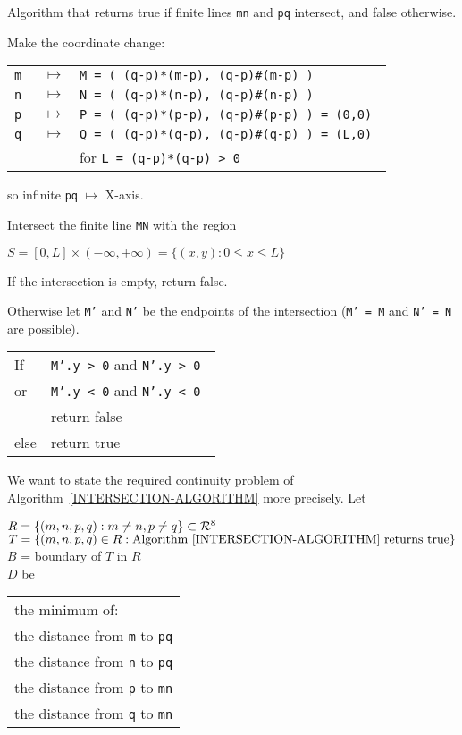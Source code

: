 \documentclass[12pt]{article}
\begin{document}
\begin{algorithm}\label{INTERSECTION-ALGORITHM}
Algorithm that returns true if finite lines {\tt mn} and {\tt pq}
intersect, and false otherwise.

Make the coordinate change:
\begin{center}
\begin{tabular}{rcl}
\tt m & $\longmapsto$ & \tt M = ( (q-p)*(m-p), (q-p)\#(m-p) ) \\
\tt n & $\longmapsto$ & \tt N = ( (q-p)*(n-p), (q-p)\#(n-p) ) \\
\tt p & $\longmapsto$ & \tt P = ( (q-p)*(p-p), (q-p)\#(p-p) ) = (0,0) \\
\tt q & $\longmapsto$ & \tt Q = ( (q-p)*(q-p), (q-p)\#(q-p) ) = (L,0) \\
      &               & for {\tt L = (q-p)*(q-p) > 0} \\
\end{tabular}
\end{center}

so infinite {\tt pq} $\longmapsto$ X-axis.

Intersect the finite line {\tt MN} with the region
\begin{center}
$S = [0,L]\times(-\infty,+\infty) = \{(x,y):0\leq x\leq L\}$
\end{center}

If the intersection is empty, return false.

Otherwise let {\tt M'} and {\tt N'} be the endpoints of the intersection
({\tt M' = M} and {\tt N' = N} are possible).
\begin{center}
\begin{tabular}{ll}
If & {\tt M'.y > 0} and {\tt N'.y > 0 } \\
or & {\tt M'.y < 0} and {\tt N'.y < 0 } \\
   & return false \\
else & return true \\
\end{tabular}
\end{center}

\end{algorithm}

We want to state the required continuity problem of
Algorithm~\ref{INTERSECTION-ALGORITHM} more precisely.
Let
\begin{center}
$R=\{(m,n,p,q): m\neq n, p\neq q\} \subset {\cal R}^8$ \\
$T=\{(m,n,p,q)\in R:
     \textrm{Algorithm~\ref{INTERSECTION-ALGORITHM} returns true}\}$ \\
$B$ = boundary of $T$ in $R$ \\
$D$ be \begin{tabular}[t]{@{}l}
the minimum of: \\
the distance from {\tt m} to {\tt pq} \\
the distance from {\tt n} to {\tt pq} \\
the distance from {\tt p} to {\tt mn} \\
the distance from {\tt q} to {\tt mn} \\
\end{tabular}
\end{center}
\end{document}
